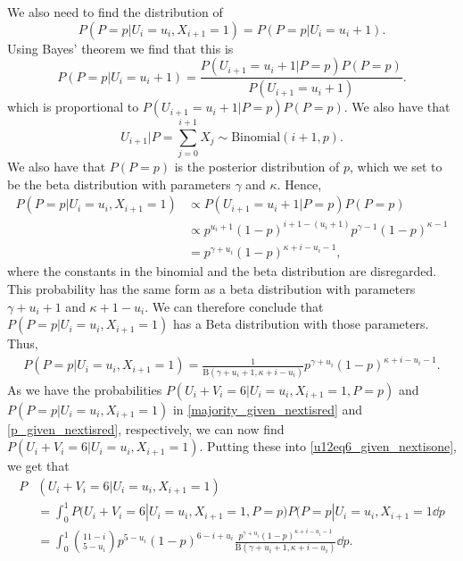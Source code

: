 We also need to find the distribution of
\begin{equation*}
    P(P=p|U_i=u_i,X_{i+1}=1) = P(P=p|U_i=u_i+1).
\end{equation*}
Using Bayes' theorem we find that this is
\begin{equation*}
    P(P=p|U_i=u_i+1) = \frac{P(U_{i+1}=u_i+1|P=p)P(P=p)}{P(U_{i+1}=u_i+1)} .
\end{equation*}
which is proportional to $P(U_{i+1}=u_i+1|P=p)P(P=p)$. We also have that 
\begin{equation*}
    U_{i+1}|P = \sum_{j=0}^{i+1} X_j \sim \text{Binomial}(i+1,p).
\end{equation*}
We also have that $P(P=p)$ is the posterior distribution of $p$, which we set to be the beta distribution with parameters $\gamma$ and $\kappa$. 
Hence, 
\begin{equation*}
    \begin{aligned}
        P(P=p|U_i=u_i, X_{i+1}=1) 
        &\propto P(U_{i+1}=u_i+1|P=p)P(P=p)\\[6pt]
        &\propto p^{u_i+1}(1-p)^{i+1-(u_i+1)}p^{\gamma-1}(1-p)^{\kappa-1}\\[6pt]
        &= p^{\gamma+u_i}(1-p)^{\kappa+i-u_i-1},
    \end{aligned}
\end{equation*}
where the constants in the binomial and the beta distribution are disregarded. This probability has the same form as a beta distribution with parameters $\gamma+u_i+1$ and $\kappa+1-u_i$. We can therefore conclude that $P(P=p|U_i=u_i, X_{i+1}=1)$ has a Beta distribution with those parameters. Thus,
\begin{equation}
\label{p_given_nextisred}
    \begin{aligned}
        P(P=p|U_i=u_i, X_{i+1}=1) 
        = \frac{1}{\text{B}(\gamma+u_i+1,\kappa+i-u_i)} 
        p^{\gamma+u_i}(1-p)^{\kappa+i-u_i-1}. 
    \end{aligned}
\end{equation}
As we have the probabilities $P(U_i+V_i=6|U_i=u_i,X_{i+1}=1,P=p)$ and $P(P=p|U_i=u_i,X_{i+1}=1)$ in \eqref{majority_given_nextisred} and \eqref{p_given_nextisred}, respectively, we can now find $P(U_i+V_i=6|U_i=u_i,X_{i+1}=1)$. Putting these into \eqref{u12eq6_given_nextisone}, we get that
\begin{equation*}
    \begin{aligned}
        P&(U_i+V_i=6|U_i=u_i,X_{i+1}=1) \\[6pt]
        &= \int_0^1 P(U_i+V_i=6|U_i=u_i,X_{i+1}=1,P=p)
        P(P=p|U_i=u_i,X_{i+1}=1 \dd p\\[6pt]
        &= \int_0^1 \binom{11-i}{5-u_i} p^{5-u_i}(1-p)^{6-i+u_i}
        \frac{p^{\gamma+u_i}(1-p)^{\kappa+i-u_i-1}}{\text{B}(\gamma+u_i+1,\kappa+i-u_i)} \dd p.
    \end{aligned}
\end{equation*}
